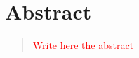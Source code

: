 \documentclass[11pt, a4paper, onecolumn, fleqn, twoside, titlepage, openright]{book}
\begin{document}
	\clearpage


	\chapter*{Abstract}
	\label{abstract}

	\begin{quote}
		\textcolor{red}{Write here the abstract}
	\end{quote}


	\tableofcontents	


	


	



	



	



	



	
\end{document}
